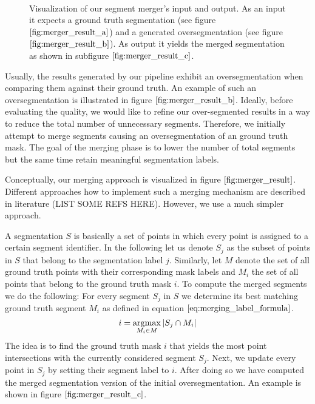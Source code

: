 \begin{figure}[H]
\begin{center}
~

\end{center}
\caption[Segmentation Merger]{Visualization of our segment merger's input and output. As an input it expects a ground truth segmentation (see figure $\ref{fig:merger_result_a}$) and a generated oversegmentation (see figure $\ref{fig:merger_result_b}$). As output it yields the merged segmentation as shown in subfigure $\ref{fig:merger_result_c}$.}
\label{fig:merger_result}
\end{figure}
Usually, the results generated by our pipeline exhibit an oversegmentation when comparing them against their ground truth. An example of such an oversegmentation is illustrated in figure $\ref{fig:merger_result_b}$. Ideally, before evaluating the quality, we would like to refine our over-segmented results in a way to reduce the total number of unnecessary segments. Therefore, we initially attempt to merge segments causing an oversegmentation of an ground truth mask. The goal of the merging phase is to lower the number of total segments but the same time retain meaningful segmentation labels. 

Conceptually, our merging approach is visualized in figure $\ref{fig:merger_result}$. Different approaches how to implement such a merging mechanism are described in literature (LIST SOME REFS HERE). However, we use a much simpler approach. 

A segmentation $S$ is basically a set of points in which every point is assigned to a certain segment identifier. In the following let us denote $S_j$ as the subset of points in $S$ that belong to the segmentation label $j$. Similarly, let $M$ denote the set of all ground truth points with their corresponding mask labels and $M_i$ the set of all points that belong to the ground truth mask $i$. To compute the merged segments we do the following: For every segment $S_j$ in $S$ we determine its best matching ground truth segment $M_i$ as defined in equation $\ref{eq:merging_label_formula}$. 
\begin{equation}
i = \operatorname*{\arg\!\max}\limits_{M_i \in M} \left\vert{S_j \cap M_i}\right\vert
\label{eq:merging_label_formula}
\end{equation}
The idea is to find the ground truth mask $i$ that yields the most point intersections with the currently considered segment $S_j$. Next, we update every point in $S_j$ by setting their segment label to $i$. After doing so we have computed the merged segmentation version of the initial oversegmentation. An example is shown in figure $\ref{fig:merger_result_c}$.

